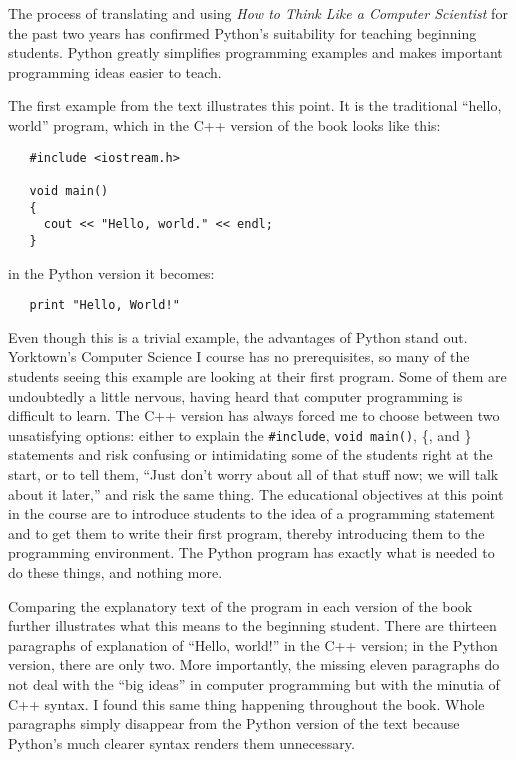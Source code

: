 The process of translating and using {\em How to Think Like a Computer
Scientist} for the past two years has confirmed Python's suitability
for teaching beginning students.  Python greatly simplifies
programming examples and makes important programming ideas easier to
teach.

The first example from the text illustrates this point.
It is the traditional ``hello, world'' program, which in the C++
version of the book looks like this:

\begin{verbatim}
   #include <iostream.h>

   void main()
   {
     cout << "Hello, world." << endl;
   }
\end{verbatim}

in the Python version it becomes:

\begin{verbatim}
   print "Hello, World!"
\end{verbatim}

Even though this is a trivial example, the advantages of Python stand
out.  Yorktown's Computer Science I course has no prerequisites, so
many of the students seeing this example are looking at their first
program.  Some of them are undoubtedly a little nervous, having heard
that computer programming is difficult to learn. The C++ version has
always forced me to choose between two unsatisfying options: either to
explain the {\tt \#include}, {\tt void main()}, \{, and \} statements
and risk confusing or intimidating some of the students right at the
start, or to tell them, ``Just don't worry about all of that stuff
now; we will talk about it later,'' and risk the same thing.  The
educational objectives at this point in the course are to introduce
students to the idea of a programming statement and to get them to
write their first program, thereby introducing them to the programming
environment.  The Python program has exactly what is needed to do these
things, and nothing more.

Comparing the explanatory text of the program in each version of
the book further illustrates what this means to the beginning student.
There are thirteen paragraphs of explanation of ``Hello, world!'' in the
C++ version; in the Python version, there are only two. More importantly,
the missing eleven paragraphs do not deal with the ``big ideas'' in
computer programming but with the minutia of C++ syntax.  I found this
same thing happening throughout the book.  Whole paragraphs simply
disappear from the Python version of the text because Python's much
clearer syntax renders them unnecessary.

